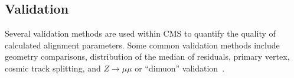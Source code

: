 









\subsection{Validation}

Several validation methods are used within CMS to quantify the quality of calculated alignment parameters. Some common validation methods include geometry comparisons, distribution of the median of residuals, primary vertex, cosmic track splitting, and $Z\rightarrow\mu\mu$ or ``dimuon'' validation~\cite{2022166795}.

